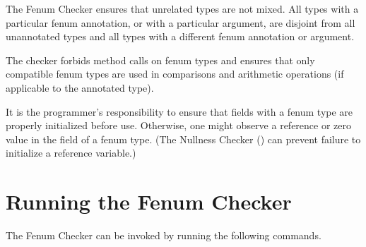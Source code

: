 The Fenum Checker ensures that unrelated types are not mixed.
All types with a particular fenum annotation, or  with a particular  argument, are
disjoint from all unannotated types and all types with a different fenum
annotation or  argument.

The checker forbids method calls on fenum types and ensures that
only compatible fenum types are used in comparisons and arithmetic operations
(if applicable to the annotated type).

It is the programmer's responsibility to ensure that fields with a fenum type
are properly initialized before use.  Otherwise, one might observe a 
reference or zero value in the field of a fenum type.  (The Nullness Checker
() can prevent failure to initialize a
reference variable.)


\section{Running the Fenum Checker\label{fenum-running}}

The Fenum Checker can be invoked by running the following commands.

